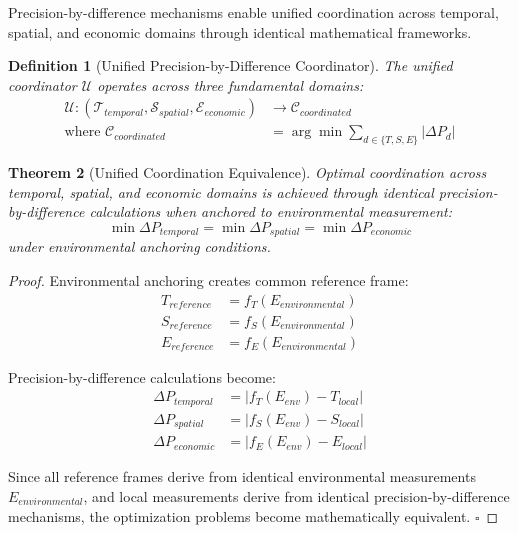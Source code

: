 \documentclass[12pt,a4paper]{article}
\newtheorem{theorem}{Theorem}
\newtheorem{definition}[theorem]{Definition}
\begin{document}
Precision-by-difference mechanisms enable unified coordination across temporal, spatial, and economic domains through identical mathematical frameworks.

\begin{definition}[Unified Precision-by-Difference Coordinator]
The unified coordinator $\mathcal{U}$ operates across three fundamental domains:
\begin{align}
\mathcal{U}: (\mathcal{T}_{temporal}, \mathcal{S}_{spatial}, \mathcal{E}_{economic}) &\to \mathcal{C}_{coordinated} \\
\text{where } \mathcal{C}_{coordinated} &= \arg\min \sum_{d \in \{T,S,E\}} |\Delta P_d|
\end{align}
\end{definition}

\begin{theorem}[Unified Coordination Equivalence]
Optimal coordination across temporal, spatial, and economic domains is achieved through identical precision-by-difference calculations when anchored to environmental measurement:
\begin{equation}
\min \Delta P_{temporal} = \min \Delta P_{spatial} = \min \Delta P_{economic}
\end{equation}
under environmental anchoring conditions.
\end{theorem}

\begin{proof}
Environmental anchoring creates common reference frame:
\begin{align}
T_{reference} &= f_T(E_{environmental}) \\
S_{reference} &= f_S(E_{environmental}) \\
E_{reference} &= f_E(E_{environmental})
\end{align}

Precision-by-difference calculations become:
\begin{align}
\Delta P_{temporal} &= |f_T(E_{env}) - T_{local}| \\
\Delta P_{spatial} &= |f_S(E_{env}) - S_{local}| \\
\Delta P_{economic} &= |f_E(E_{env}) - E_{local}|
\end{align}

Since all reference frames derive from identical environmental measurements $E_{environmental}$, and local measurements derive from identical precision-by-difference mechanisms, the optimization problems become mathematically equivalent. $\square$
\end{proof}
\end{document}
